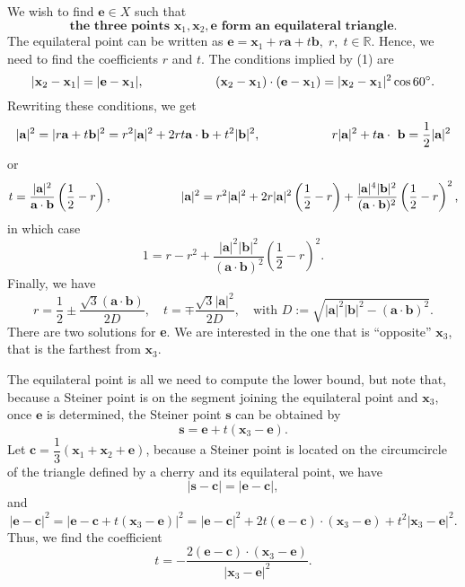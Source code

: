 \documentclass{article}
\theoremstyle{plain}
\begin{document}
We wish to find $\textbf{e} \in X$ such that 
\begin{equation}\textbf{the three points $\textbf{x}_1, \textbf{x}_2, \textbf{e}$ form an equilateral triangle.}\end{equation}
The equilateral point can be written as $\textbf{e} = \textbf{x}_1 + r\textbf{a} + t\textbf{b}, \; r,\; t \in \mathbb{R}$. 
Hence, we need to find the coefficients $r$ and $t$. The conditions implied by (1) are
\[|\textbf{x}_2 - \textbf{x}_1| = |\textbf{e} - \textbf{x}_1|, \hspace*{2cm} (\textbf{x}_2 - \textbf{x}_1) \cdot (\textbf{e} - \textbf{x}_1) = |\textbf{x}_2 - \textbf{x}_1|^{2}\cos 60\degree.\]
Rewriting these conditions, we get 
\[|\textbf{a}|^2 = |r\textbf{a} + t\textbf{b}|^2 = r^2|\textbf{a}|^2 + 2rt\textbf{a} \cdot \textbf{b} + t^2|\textbf{b}|^2, \hspace*{2cm} r|\textbf{a}|^2 + t\textbf{a} \cdot\ \textbf{b} = \dfrac{1}{2}|\textbf{a}|^2\]
or
\[t = \dfrac{|\textbf{a}|^2}{\textbf{a} \cdot \textbf{b}}\left(\dfrac{1}{2} - r\right), \hspace*{2cm} |\textbf{a}|^2 = r^2|\textbf{a}|^2 + 2r|\textbf{a}|^2\left(\dfrac{1}{2} - r\right) + \dfrac{|\textbf{a}|^4|\textbf{b}|^2}{(\textbf{a} \cdot \textbf{b})^2}\left(\dfrac{1}{2} - r\right)^2,\]
in which case
\[1 = r - r^2 + \dfrac{|\textbf{a}|^2|\textbf{b}|^2}{(\textbf{a} \cdot \textbf{b})^2}\left(\dfrac{1}{2} - r\right)^2.\]
Finally, we have
\[r = \dfrac{1}{2} \pm \dfrac{\sqrt{3}(\textbf{a} \cdot \textbf{b})}{2D}, \quad t = \mp \dfrac{\sqrt{3}|\textbf{a}|^2}{2D}, \quad \text{with } D := \sqrt{|\textbf{a}|^2|\textbf{b}|^2 - (\textbf{a} \cdot \textbf{b})^2}.\]
There are two solutions for \textbf{e}. 
We are interested in the one that is ``opposite'' $\textbf{x}_3$, that is the  farthest from $\textbf{x}_3$. 

The equilateral point is all we need to compute the lower bound, but note that, 
because a Steiner point is on the segment joining the equilateral point and 
$\textbf{x}_3$,  once $\textbf{e}$ is determined, the Steiner point $\textbf{s}$ can be obtained by
\[\textbf{s} = \textbf{e} + t(\textbf{x}_3 - \textbf{e}).\]
Let $\textbf{c} = \dfrac{1}{3}(\textbf{x}_1 + \textbf{x}_2 + \textbf{e})$, 
because a Steiner point is located on the circumcircle of the triangle defined by a cherry and its equilateral point, we have 
\[|\textbf{s} - \textbf{c}| = |\textbf{e} - \textbf{c}|,\]
and
\[|\textbf{e} - \textbf{c}|^2 = |\textbf{e} - \textbf{c} + t(\textbf{x}_3 - \textbf{e})|^2 = |\textbf{e} - \textbf{c}|^2 + 2t(\textbf{e} - \textbf{c}) \cdot (\textbf{x}_3 - \textbf{e}) + t^2|\textbf{x}_3 - \textbf{e}|^2.\]
Thus, we find the coefficient
\[t = - \dfrac{2(\textbf{e} - \textbf{c}) \cdot (\textbf{x}_3 - \textbf{e})}{|\textbf{x}_3 - \textbf{e}|^2}.\]
\end{document}
